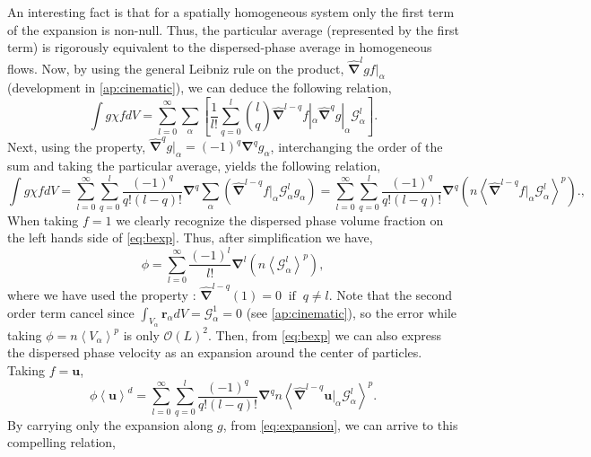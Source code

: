 An interesting fact is that for a spatially homogeneous system only the first term of the expansion is non-null. 
Thus, the particular average (represented by the first term) is rigorously equivalent to the dispersed-phase average in homogeneous flows. 
Now, by using the general Leibniz rule on the product, $\hat{\bm{\nabla}}^l gf|_\alpha$ (development in \ref{ap:cinematic}), we can deduce the following relation,
\begin{equation}
    \int g \chi f  dV 
    = \sum_{l=0}^\infty \sum_\alpha \left[\frac{1}{l!} \sum_{q = 0}^l \binom{l}{q} \hat{\bm{\nabla}}^{l-q}f|_\alpha \hat{\bm{\nabla}}^q g|_\alpha \mathcal{G}_\alpha^l\right].
\end{equation}
Next, using the property, $\hat{\bm{\nabla}}^{q} g|_\alpha = (-1)^q \bm{\nabla}^{q} g_\alpha$, interchanging the order of the sum and taking the particular average, yields the following relation,
\begin{equation}
    \int g \chi f  dV 
    = \sum_{l=0}^\infty \sum_{q = 0}^l \frac{(-1)^q}{q!(l-q)!}  \bm{\nabla}^q  \sum_\alpha \left(\hat{\bm{\nabla}}^{l-q} f|_\alpha \mathcal{G}_\alpha^l g_\alpha\right)
    = \sum_{l=0}^\infty \sum_{q = 0}^l \frac{(-1)^q}{q!(l-q)!}  \bm{\nabla}^q \left( n \left<\hat{\bm{\nabla}}^{l-q} f|_\alpha \mathcal{G}_\alpha^l\right>^p\right).
    \label{eq:bexp},
\end{equation}
When taking $f = 1$ we clearly recognize the dispersed phase volume fraction on the left hands side of \ref{eq:bexp}.
Thus, after simplification we have,
\begin{equation}
    \phi
    = \sum_{l=0}^\infty \frac{(-1)^l}{l!}  \bm{\nabla}^l \left( n \left<\mathcal{G}_\alpha^l\right>^p\right),
\end{equation}
where we have used the property : $\hat{\bm{\nabla}}^{l-q} (1)= 0 \;\; \text{if}\;\; q \neq l$. 
Note that the second order term cancel since $\int_{V_\alpha} \bm{r}_\alpha dV= \mathcal{G}_\alpha^1 = 0$ (see \ref{ap:cinematic}), so the error while taking $\phi = n \left<V_\alpha\right>^p$ is only $\mathcal{O}\left(L\right)^2$.
Then, from \ref{eq:bexp} we can also express the dispersed phase velocity as an expansion around the center of particles. 
Taking $f = \bm{u}$,
\begin{equation}
    \phi\left<\bm{u}\right>^d 
    = \sum_{l=0}^\infty \sum_{q = 0}^l \frac{(-1)^q}{q!(l-q)!}  \bm{\nabla}^q  n \left<\hat{\bm{\nabla}}^{l-q} \bm{u}|_\alpha \mathcal{G}_\alpha^l\right>^p.
\end{equation}
By carrying only the expansion along $g$, from \ref{eq:expansion}, we can arrive to this compelling relation,
